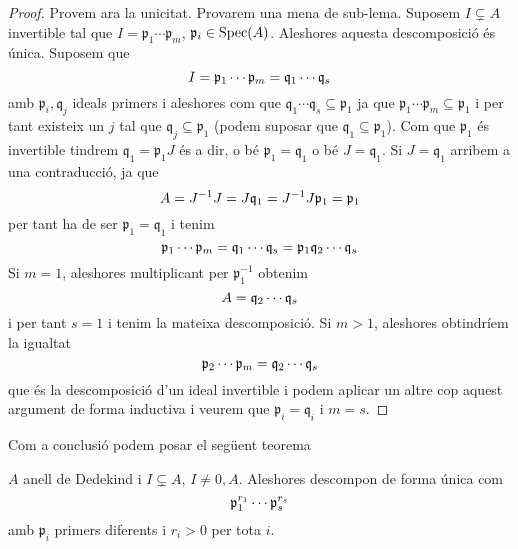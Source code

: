\documentclass[../../../main.tex]{subfiles}
\begin{document}
\begin{proof}
Provem ara la unicitat. Provarem una mena de sub-lema. Suposem $I\varsubsetneq A$ invertible tal que $I = \mathfrak{p}_1\cdots\mathfrak{p}_m$, $\mathfrak{p}_i\in\mathrm{Spec}(A)$. Aleshores aquesta descomposició és única. Suposem que
\begin{equation}
    \notag
    I = \mathfrak{p}_1\cdots\mathfrak{p}_m = \mathfrak{q}_1\cdots\mathfrak{q}_s
\end{equation}
amb $\mathfrak{p}_i,\mathfrak{q}_j$ ideals primers i aleshores com que $\mathfrak{q}_1\cdots\mathfrak{q}_s\subseteq \mathfrak{p}_1$ ja que $\mathfrak{p}_1\cdots\mathfrak{p}_m\subseteq\mathfrak{p}_1$ i per tant existeix un $j$ tal que $\mathfrak{q}_j\subseteq\mathfrak{p}_1$ (podem suposar que $\mathfrak{q}_1\subseteq\mathfrak{p}_1$). Com que $\mathfrak{p}_1$ és invertible tindrem $\mathfrak{q}_1 = \mathfrak{p}_1J$ és a dir, o bé $\mathfrak{p}_1 = \mathfrak{q}_1$ o bé $J = \mathfrak{q}_1$. Si $J = \mathfrak{q}_1$ arribem a una contraducció, ja que 
\begin{equation}
    \notag
    A = J^{-1}J = J\mathfrak{q}_1 = J^{-1}J\mathfrak{p}_1 = \mathfrak{p}_1
\end{equation}
per tant ha de ser $\mathfrak{p}_1 = \mathfrak{q}_1$ i tenim
\begin{equation}
    \notag
    \mathfrak{p}_1\cdots\mathfrak{p}_m = \mathfrak{q}_1\cdots\mathfrak{q}_s = \mathfrak{p}_1\mathfrak{q}_2\cdots\mathfrak{q}_s
\end{equation}
Si $m = 1$, aleshores multiplicant per $\mathfrak{p}_1^{-1}$ obtenim
\begin{equation}
    \notag
    A = \mathfrak{q}_2\cdots\mathfrak{q}_s
\end{equation}
i per tant $s = 1$ i tenim la mateixa descomposició. Si $m>1$, aleshores obtindríem la igualtat
\begin{equation}
    \notag
    \mathfrak{p}_2\cdots\mathfrak{p}_m = \mathfrak{q}_2\cdots\mathfrak{q}_s
\end{equation}
que és la descomposició d'un ideal invertible i podem aplicar un altre cop aquest argument de forma inductiva i veurem que $\mathfrak{p}_i = \mathfrak{q}_i$ i $m = s$.
\end{proof}


Com a conclusió podem posar el següent teorema
\begin{ter}
[R. Dedekind]\label{ter:teoremaDeDedekind} $A$ anell de Dedekind i $I\varsubsetneq A$, $I\not=0,A$. Aleshores descompon de forma única com
\begin{equation}
    \notag
    \mathfrak{p}_1^{r_1}\cdots\mathfrak{p}_s^{r_s}
\end{equation}
amb $\mathfrak{p}_i$ primers diferents i $r_i>0$ per tota $i$.
\end{ter}
\end{document}
